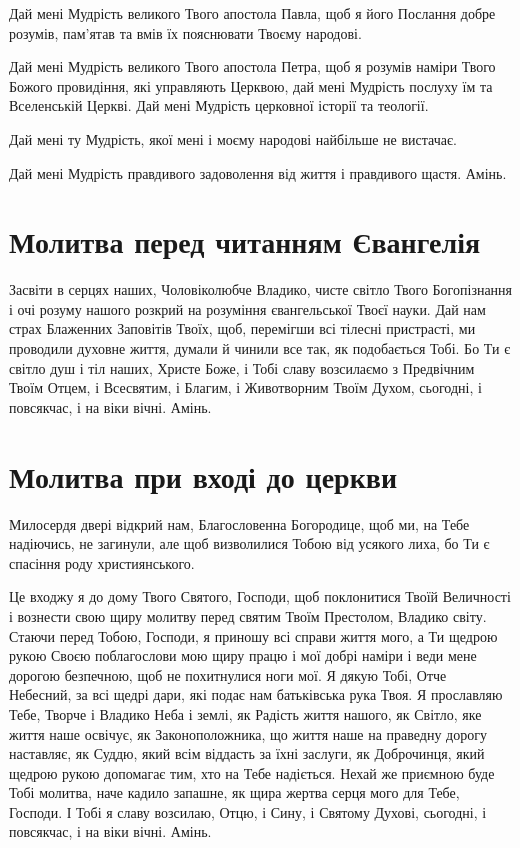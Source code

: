 \documentclass[chapters.tex]{subfiles}
\begin{document}
Дай мені Мудрість великого Твого апостола Павла, щоб я його Послання добре розумів, пам’ятав та вмів їх пояснювати Твоєму народові.

Дай мені Мудрість великого Твого апостола Петра, щоб я розумів наміри Твого Божого провидіння, які управляють Церквою, дай мені Мудрість послуху їм та Вселенській Церкві. Дай мені Мудрість церковної історії та теології.

Дай мені ту Мудрість, якої мені і моєму народові найбільше не вистачає.

Дай мені Мудрість правдивого задоволення від життя і правдивого щастя. Амінь.

\section{Молитва перед читанням Євангелія}
Засвіти в серцях наших, Чоловіколюбче Владико, чисте світло Твого Богопізнання і очі розуму нашого розкрий на розуміння євангельської Твоєї науки. Дай нам страх Блаженних Заповітів Твоїх, щоб, перемігши всі тілесні пристрасті, ми проводили духовне життя, думали й чинили все так, як подобається Тобі. Бо Ти є світло душ і тіл наших, Христе Боже, і Тобі славу возсилаємо з Предвічним Твоїм Отцем, і Всесвятим, і Благим, і Животворним Твоїм Духом, сьогодні, і повсякчас, і на віки вічні. Амінь.

\section{Молитва при вході до церкви}
Милосердя двері відкрий нам, Благословенна Богородице, щоб ми, на Тебе надіючись, не загинули, але щоб визволилися Тобою від усякого лиха, бо Ти є спасіння роду християнського.

Це входжу я до дому Твого Святого, Господи, щоб поклонитися Твоїй Величності і вознести свою щиру молитву перед святим Твоїм Престолом, Владико світу. Стаючи перед Тобою, Господи, я приношу всі справи життя мого, а Ти щедрою рукою Своєю поблагослови мою щиру працю і мої добрі наміри і веди мене дорогою безпечною, щоб не похитнулися ноги мої. Я дякую Тобі, Отче Небесний, за всі щедрі дари, які подає нам батьківська рука Твоя. Я прославляю Тебе, Творче і Владико Неба і землі, як Радість життя нашого, як Світло, яке життя наше освічує, як Законоположника, що життя наше на праведну дорогу наставляє, як Суддю, який всім віддасть за їхні заслуги, як Доброчинця, який щедрою рукою допомагає тим, хто на Тебе надіється. Нехай же приємною буде Тобі молитва, наче кадило запашне, як щира жертва серця мого для Тебе, Господи. І Тобі я славу возсилаю, Отцю, і Сину, і Святому Духові, сьогодні, і повсякчас, і на віки вічні. Амінь.
\end{document}
